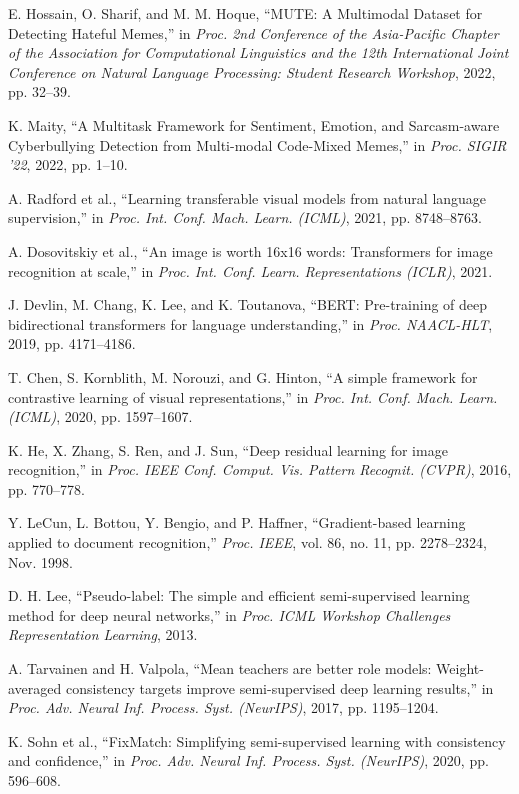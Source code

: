 \documentclass{ieeeaccess}
\begin{document}
\begin{thebibliography}{00}
 E. Hossain, O. Sharif, and M. M. Hoque, ``MUTE: A Multimodal Dataset for Detecting Hateful Memes,'' in \emph{Proc. 2nd Conference of the Asia-Pacific Chapter of the Association for Computational Linguistics and the 12th International Joint Conference on Natural Language Processing: Student Research Workshop}, 2022, pp. 32--39.

 K. Maity, ``A Multitask Framework for Sentiment, Emotion, and Sarcasm-aware Cyberbullying Detection from Multi-modal Code-Mixed Memes,'' in \emph{Proc. SIGIR '22}, 2022, pp. 1--10.

 A. Radford et al., ``Learning transferable visual models from natural language supervision,'' in \emph{Proc. Int. Conf. Mach. Learn. (ICML)}, 2021, pp. 8748--8763.

 A. Dosovitskiy et al., ``An image is worth 16x16 words: Transformers for image recognition at scale,'' in \emph{Proc. Int. Conf. Learn. Representations (ICLR)}, 2021.

 J. Devlin, M. Chang, K. Lee, and K. Toutanova, ``BERT: Pre-training of deep bidirectional transformers for language understanding,'' in \emph{Proc. NAACL-HLT}, 2019, pp. 4171--4186.

 T. Chen, S. Kornblith, M. Norouzi, and G. Hinton, ``A simple framework for contrastive learning of visual representations,'' in \emph{Proc. Int. Conf. Mach. Learn. (ICML)}, 2020, pp. 1597--1607.

 K. He, X. Zhang, S. Ren, and J. Sun, ``Deep residual learning for image recognition,'' in \emph{Proc. IEEE Conf. Comput. Vis. Pattern Recognit. (CVPR)}, 2016, pp. 770--778.

 Y. LeCun, L. Bottou, Y. Bengio, and P. Haffner, ``Gradient-based learning applied to document recognition,'' \emph{Proc. IEEE}, vol. 86, no. 11, pp. 2278--2324, Nov. 1998.

 D. H. Lee, ``Pseudo-label: The simple and efficient semi-supervised learning method for deep neural networks,'' in \emph{Proc. ICML Workshop Challenges Representation Learning}, 2013.

 A. Tarvainen and H. Valpola, ``Mean teachers are better role models: Weight-averaged consistency targets improve semi-supervised deep learning results,'' in \emph{Proc. Adv. Neural Inf. Process. Syst. (NeurIPS)}, 2017, pp. 1195--1204.

 K. Sohn et al., ``FixMatch: Simplifying semi-supervised learning with consistency and confidence,'' in \emph{Proc. Adv. Neural Inf. Process. Syst. (NeurIPS)}, 2020, pp. 596--608.


\end{thebibliography}
\end{document}
